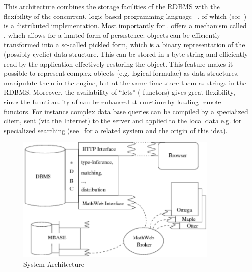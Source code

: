 This architecture combines the storage facilities of the RDBMS with the flexibility of the
concurrent, logic-based programming language {\oz}~\cite{Smolka:Oz:95}, of which {\mozart}
(see~\cite{Mozart:URL}) is a distributed implementation.  Most importantly for {\mbase},
{\mozart} offers a mechanism called {}, which allows for a limited form of
persistence: {\mozart} objects can be efficiently transformed into a so-called pickled
form, which is a binary representation of the (possibly cyclic) data structure.  This can
be stored in a byte-string and efficiently read by the {\mozart} application effectively
restoring the object.  This feature makes it possible to represent complex objects
(e.g. logical formulae) as {\oz} data structures, manipulate them in the {\mozart} engine,
but at the same time store them as strings in the RDBMS. Moreover, the availability of
``{\oz}lets'' ({\mozart} functors) gives {\mbase} great flexibility, since the
functionality of {\mbase} can be enhanced at run-time by loading remote functors. For
instance complex data base queries can be compiled by a specialized {\mbase} client, sent
(via the Internet) to the {\mbase} server and applied to the local data e.g. for
specialized searching (see~\cite{Duchier:tntb98} for a related system and the origin of
this idea).

\begin{figure}
  \begin{center}
    \includegraphics[width=10cm]{projects/mbase/mbase}
    \caption{System Architecture}\label{fig:mbase}
  \end{center}
\end{figure}

